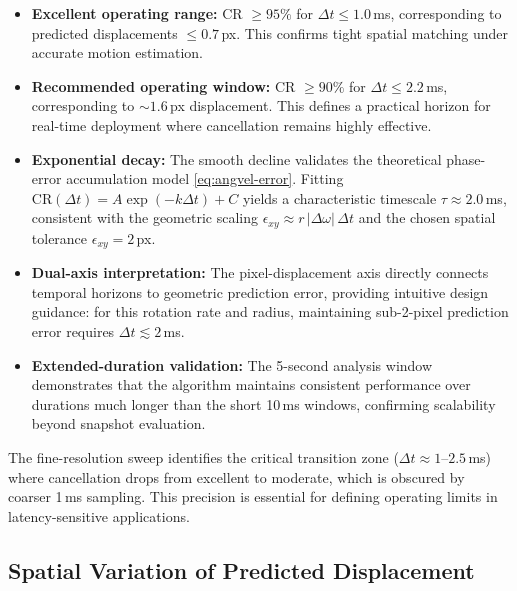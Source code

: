 \begin{itemize}
  \item \textbf{Excellent operating range:} CR $\geq 95\%$ for $\Delta t \leq 1.0$\,ms, corresponding to predicted displacements $\leq 0.7$\,px. This confirms tight spatial matching under accurate motion estimation.
  
  \item \textbf{Recommended operating window:} CR $\geq 90\%$ for $\Delta t \leq 2.2$\,ms, corresponding to $\sim 1.6$\,px displacement. This defines a practical horizon for real-time deployment where cancellation remains highly effective.
  
  \item \textbf{Exponential decay:} The smooth decline validates the theoretical phase-error accumulation model \eqref{eq:angvel-error}. Fitting $\mathrm{CR}(\Delta t) = A \exp(-k\Delta t) + C$ yields a characteristic timescale $\tau \approx 2.0$\,ms, consistent with the geometric scaling $\epsilon_{xy} \approx r\,|\Delta\omega|\,\Delta t$ and the chosen spatial tolerance $\epsilon_{xy}=2$\,px.
  
  \item \textbf{Dual-axis interpretation:} The pixel-displacement axis directly connects temporal horizons to geometric prediction error, providing intuitive design guidance: for this rotation rate and radius, maintaining sub-2-pixel prediction error requires $\Delta t \lesssim 2$\,ms.
  
  \item \textbf{Extended-duration validation:} The 5-second analysis window demonstrates that the algorithm maintains consistent performance over durations much longer than the short 10\,ms windows, confirming scalability beyond snapshot evaluation.
\end{itemize}

The fine-resolution sweep identifies the critical transition zone ($\Delta t \approx 1$--$2.5$\,ms) where cancellation drops from excellent to moderate, which is obscured by coarser 1\,ms sampling. This precision is essential for defining operating limits in latency-sensitive applications.


\subsection{Spatial Variation of Predicted Displacement}

